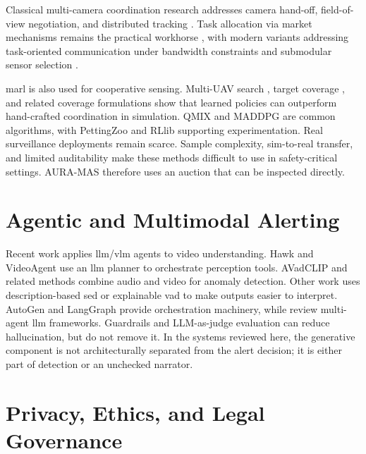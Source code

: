 Classical multi-camera coordination research addresses camera hand-off, field-of-view negotiation, and distributed tracking \cite{amosa2023multicamera, sanmiguel2022detection}. Task allocation via market mechanisms remains the practical workhorse \cite{smith1980contract, parker2002alliance}, with modern variants addressing task-oriented communication under bandwidth constraints \cite{zhang2026taskoriented} and submodular sensor selection \cite{liu2026submodular}.

\gls{marl} is also used for cooperative sensing. Multi-UAV search \cite{zheng2026multiuav}, target coverage \cite{yang2025multiagent}, and related coverage formulations \cite{wang2026improved} show that learned policies can outperform hand-crafted coordination in simulation. QMIX \cite{rashid2018qmix} and MADDPG \cite{lowe2017multiagent} are common algorithms, with PettingZoo \cite{terry2021pettingzoo} and RLlib \cite{liang2018rllib} supporting experimentation. Real surveillance deployments remain scarce. Sample complexity, sim-to-real transfer, and limited auditability make these methods difficult to use in safety-critical settings. AURA-MAS therefore uses an auction that can be inspected directly.

\section{Agentic and Multimodal Alerting}

Recent work applies \gls{llm}/\gls{vlm} agents to video understanding. Hawk \cite{cheng2025hawk} and VideoAgent \cite{fan2024videoagent} use an \gls{llm} planner to orchestrate perception tools. AVadCLIP \cite{wu2025avadclip} and related methods \cite{ustun2026multimodal} combine audio and video for anomaly detection. Other work uses description-based \gls{sed} \cite{nishida2026description} or explainable \gls{vad} \cite{huang2025exvad, alkahtani2026explainable} to make outputs easier to interpret. AutoGen \cite{wu2023autogen} and LangGraph \cite{langgraph2024} provide orchestration machinery, while \cite{sapkota2025ai, fan2024survey, duan2024exploration} review multi-agent \gls{llm} frameworks. Guardrails \cite{rebedea2023nemo} and LLM-as-judge evaluation \cite{zheng2023judging} can reduce hallucination, but do not remove it. In the systems reviewed here, the generative component is not architecturally separated from the alert decision; it is either part of detection or an unchecked narrator.

\section{Privacy, Ethics, and Legal Governance}

